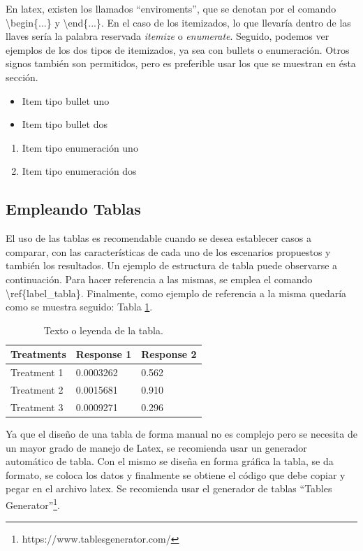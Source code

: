 \documentclass[1p,12pt]{elsarticle}
\begin{document}
En latex, existen los llamados ``enviroments'', que se denotan por el comando \textbackslash begin\{...\} y \textbackslash end\{...\}. En el caso de los itemizados, lo que llevaría dentro de las llaves sería la palabra reservada \textit{itemize} o \textit{enumerate}. Seguido, podemos ver ejemplos de los dos tipos de itemizados, ya sea con bullets o enumeración. Otros signos también son permitidos, pero es preferible usar los que se muestran en ésta sección.

\begin{itemize}
\item Item tipo bullet uno
\item Item tipo bullet dos
\end{itemize}

\begin{enumerate}
\item Item tipo enumeración uno
\item Item tipo enumeración dos
\end{enumerate}

\subsection{Empleando Tablas}

El uso de las tablas es recomendable cuando se desea establecer casos a comparar, con las características de cada uno de los escenarios propuestos y también los resultados. Un ejemplo de estructura de tabla puede observarse a continuación. Para hacer referencia a las mismas, se emplea el comando \textbackslash ref\{label\_tabla\}. Finalmente, como ejemplo de referencia a la misma quedaría como se muestra seguido: Tabla \ref{tab:tabla1}.

\begin{table}[h]
\centering
\begin{tabular}{l l l}
\hline
\textbf{Treatments} & \textbf{Response 1} & \textbf{Response 2}\\
\hline
Treatment 1 & 0.0003262 & 0.562 \\
Treatment 2 & 0.0015681 & 0.910 \\
Treatment 3 & 0.0009271 & 0.296 \\
\hline
\end{tabular}
\caption{Texto o leyenda de la tabla.}
\label{tab:tabla1}
\end{table}

Ya que el diseño de una tabla de forma manual no es complejo pero se necesita de un mayor grado de manejo de Latex, se recomienda usar un generador automático de tabla. Con el mismo se diseña en forma gráfica la tabla, se da formato, se coloca los datos y finalmente se obtiene el código que debe copiar y pegar en el archivo latex. Se recomienda usar el generador de tablas ``Tables Generator''\footnote{https://www.tablesgenerator.com/}.
\end{document}
